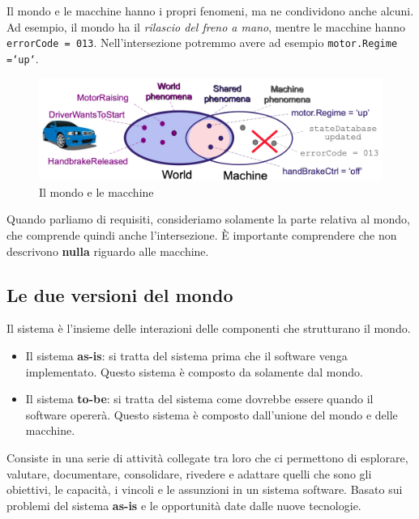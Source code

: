 Il mondo e le macchine hanno i propri fenomeni, ma ne condividono 
anche alcuni. Ad esempio, il mondo ha il \textit{rilascio del freno a mano},
mentre le macchine hanno \texttt{errorCode = 013}. Nell'intersezione 
potremmo avere ad esempio \texttt{motor.Regime =`up`}.
\begin{figure}[H]
    \centering
    \includegraphics[scale=0.3]{img/worldmod.png}
    \caption{Il mondo e le macchine}
    \label{fig:req_eng}
\end{figure}
\begin{tcolorbox}
    Quando parliamo di requisiti, consideriamo solamente la parte 
    relativa al mondo, che comprende quindi anche l'intersezione.
    È importante comprendere che non descrivono \textbf{nulla}
    riguardo alle macchine.
\end{tcolorbox}
\subsection{Le due versioni del mondo}
Il sistema è l'insieme delle interazioni delle componenti che 
strutturano il mondo.
\begin{itemize}
    \item Il sistema \textbf{as-is}: si tratta del sistema prima che 
    il software venga implementato. Questo sistema è composto da
    solamente dal mondo.
    \item Il sistema \textbf{to-be}: si tratta del sistema come 
    dovrebbe essere quando il software opererà. Questo sistema
    è composto dall'unione del mondo e delle macchine.
\end{itemize}
\begin{tcolorbox}[title=Definizione preliminare dell'ingegneria dei requisiti]
    Consiste in una serie di attività collegate tra loro che ci permettono 
    di esplorare, valutare, documentare, consolidare, rivedere e adattare 
    quelli che sono gli obiettivi, le capacità, i vincoli e le assunzioni 
    in un sistema software. Basato sui problemi del sistema \textbf{as-is}
    e le opportunità date dalle nuove tecnologie.
\end{tcolorbox}

